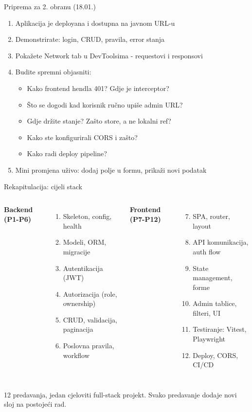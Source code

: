 \begin{frame}{Priprema za 2. obranu (18.01.)}
\begin{enumerate}
  \item Aplikacija je deployana i dostupna na javnom URL-u
  \item Demonstrirate: login, CRUD, pravila, error stanja
  \item Pokažete Network tab u DevToolsima - requestovi i responsovi
  \item Budite spremni objasniti:
  \begin{itemize}
    \item Kako frontend hendla 401? Gdje je interceptor?
    \item Što se dogodi kad korisnik ručno upiše admin URL?
    \item Gdje držite stanje? Zašto store, a ne lokalni ref?
    \item Kako ste konfigurirali CORS i zašto?
    \item Kako radi deploy pipeline?
  \end{itemize}
  \item Mini promjena uživo: dodaj polje u formu, prikaži novi podatak
\end{enumerate}
\end{frame}

\begin{frame}{Rekapitulacija: cijeli stack}
\begin{columns}[T]
\textbf{Backend (P1-P6)}
\begin{enumerate}
  \item Skeleton, config, health
  \item Modeli, ORM, migracije
  \item Autentikacija (JWT)
  \item Autorizacija (role, ownership)
  \item CRUD, validacija, paginacija
  \item Poslovna pravila, workflow
\end{enumerate}

\textbf{Frontend (P7-P12)}
\begin{enumerate}
  \setcounter{enumi}{6}
  \item SPA, router, layout
  \item API komunikacija, auth flow
  \item State management, forme
  \item Admin tablice, filteri, UI
  \item Testiranje: Vitest, Playwright
  \item Deploy, CORS, CI/CD
\end{enumerate}
\end{columns}

\vspace{0.4em}
12 predavanja, jedan cjeloviti full-stack projekt. Svako predavanje dodaje novi sloj na postojeći rad.
\end{frame}

